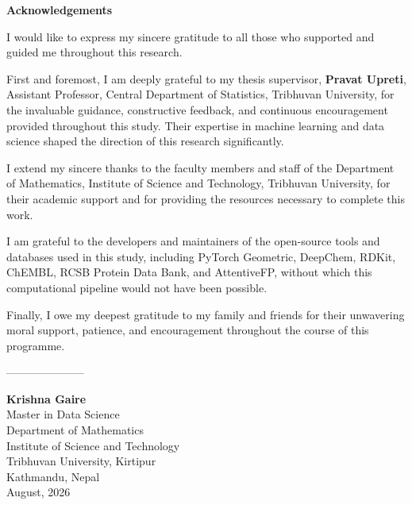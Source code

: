 
\cleardoublepage
{}
{}
\thispagestyle{plain}

\begin{center}
{\fontsize{16}{20}\selectfont\textbf{Acknowledgements}}
\end{center}

\vspace{0.5cm}

\begin{onehalfspace}

\noindent
I would like to express my sincere gratitude to all those who
supported and guided me throughout this research.

\vspace{0.3cm}

\noindent
First and foremost, I am deeply grateful to my thesis supervisor,
\textbf{Pravat Upreti}, Assistant Professor, Central Department of
Statistics, Tribhuvan University, for the invaluable guidance,
constructive feedback, and continuous encouragement provided
throughout this study. Their expertise in machine learning and data
science shaped the direction of this research significantly.

\vspace{0.3cm}

\noindent
I extend my sincere thanks to the faculty members and staff of the
Department of Mathematics, Institute of Science and Technology,
Tribhuvan University, for their academic support and for providing
the resources necessary to complete this work.

\vspace{0.3cm}

\noindent
I am grateful to the developers and maintainers of the open-source
tools and databases used in this study, including PyTorch Geometric,
DeepChem, RDKit, ChEMBL, RCSB Protein Data Bank, and AttentiveFP,
without which this computational pipeline would not have been
possible.

\vspace{0.3cm}

\noindent
Finally, I owe my deepest gratitude to my family and friends for
their unwavering moral support, patience, and encouragement
throughout the course of this programme.

\end{onehalfspace}

\vspace{1.5cm}

\noindent
---------------------

\vspace{0.3cm}

\noindent
\textbf{Krishna Gaire}\\[0.2cm]
Master in Data Science\\
Department of Mathematics\\
Institute of Science and Technology\\
Tribhuvan University, Kirtipur\\
Kathmandu, Nepal\\
August, 2026